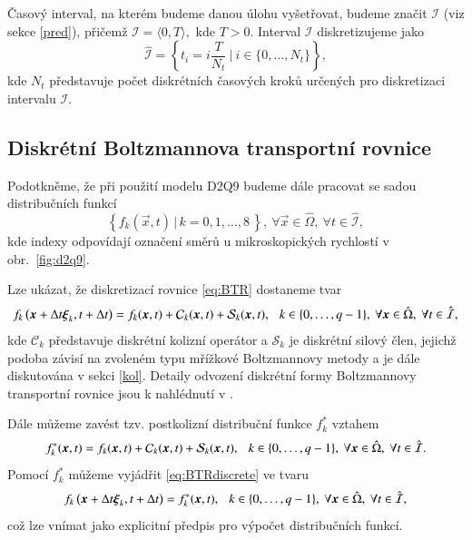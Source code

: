 Časový interval, na kterém budeme danou úlohu vyšetřovat, budeme značit $ \mathcal{I} $ (viz sekce \ref{pred}), přičemž $ \mathcal{I} = \langle 0, T \rangle,$ kde $ T > 0$. Interval $ \mathcal{I} $ diskretizujeme jako
\begin{equation}\label{eq:timediscrete}
\hat{\mathcal{I}} = \left\{ t_{i} =i\dfrac{T}{N_t} \ \Big| \ i \in \big\{0, \dots, N_{t} \big\} \right\},
\end{equation}
kde $ N_t $ představuje počet diskrétních časových kroků určených pro diskretizaci intervalu $ \mathcal{I} $.

\subsection{Diskrétní Boltzmannova transportní rovnice}
Podotkněme, že při použití modelu D2Q9 budeme dále pracovat se sadou distribučních funkcí
\begin{equation}\label{eq:ddfs}
	\left\{ f_k (\vec{x}, t)\, \big| \, k = 0, 1, \dots, 8 \, \right\} , \ \forall \vec{x} \in \hat{\Omega}, \ \forall t \in \hat{\mathcal{I}},
\end{equation}
kde indexy odpovídají označení směrů u mikroskopických rychlostí v obr.~\ref{fig:d2q9}.

Lze ukázat, že diskretizací rovnice \eqref{eq:BTR} dostaneme tvar
\begin{equation}\label{eq:BTRdiscrete}
f_{k}\left(\vec{x}+\Delta t \vec{\xi}_{k}, t+\Delta t \right) =
f_{k}(\vec{x}, t) + \mathcal{C}_{k}(\vec{x}, t) + \mathcal{S}_{k}(\vec{x}, t), \hspace{2.5mm} k \in \{0, \dots, q-1 \}, \ \forall \vec{x} \in \hat{\Omega}, \ \forall t \in \hat{\mathcal{I}},
\end{equation}
kde $ \mathcal{C}_{k} $ představuje diskrétní kolizní operátor a $ \mathcal{S}_{k} $ je diskrétní silový člen, jejichž podoba závisí na zvoleném typu mřížkové Boltzmannovy metody a je dále diskutována v sekci \ref{kol}. Detaily odvození diskrétní formy Boltzmannovy transportní rovnice jsou k nahlédnutí v \cite{Kruger}.

Dále můžeme zavést tzv. postkolizní distribuční funkce $ f^{*}_{k} $ vztahem
\begin{equation}\label{eq:fstar}
f^{*}_{k}(\vec{x}, t) = f_{k}(\vec{x}, t) + \mathcal{C}_{k}(\vec{x}, t) + \mathcal{S}_{k}(\vec{x}, t), \hspace{2.5mm} k \in \{0, \dots, q-1 \}, \ \forall \vec{x} \in \hat{\Omega}, \ \forall t \in \hat{\mathcal{I}}.
\end{equation}
Pomocí $ f^{*}_{k} $ můžeme vyjádřit \eqref{eq:BTRdiscrete} ve tvaru
\begin{equation}\label{eq:collision}
f_{k}\left(\vec{x}+\Delta t \vec{\xi}_{k}, t+\Delta t\right) = f^{*}_{k}(\vec{x}, t), \hspace{2.5mm} k \in \{0, \dots, q-1 \}, \ \forall \vec{x} \in \hat{\Omega}, \ \forall t \in \hat{\mathcal{I}},
\end{equation}
což lze vnímat jako explicitní předpis pro výpočet distribučních funkcí.

